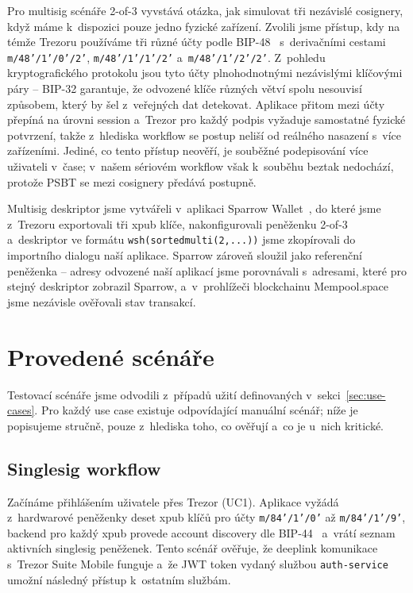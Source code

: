 Pro multisig scénáře 2-of-3 vyvstává otázka, jak simulovat tři nezávislé
cosignery, když máme k~dispozici pouze jedno fyzické zařízení. Zvolili jsme
přístup, kdy na témže Trezoru používáme tři různé účty podle BIP-48~\cite{BIP48}
s~derivačními cestami \texttt{m/48'/1'/0'/2'}, \texttt{m/48'/1'/1'/2'}
a~\texttt{m/48'/1'/2'/2'}. Z~pohledu kryptografického protokolu jsou tyto účty
plnohodnotnými nezávislými klíčovými páry -- BIP-32 garantuje, že odvozené
klíče různých větví spolu nesouvisí způsobem, který by šel z~veřejných dat
detekovat. Aplikace přitom mezi účty přepíná na úrovni session a~Trezor pro
každý podpis vyžaduje samostatné fyzické potvrzení, takže z~hlediska workflow
se postup neliší od reálného nasazení s~více zařízeními. Jediné, co tento
přístup neověří, je souběžné podepisování více uživateli v~čase; v~našem
sériovém workflow však k~souběhu beztak nedochází, protože PSBT se mezi
cosignery předává postupně.

Multisig deskriptor jsme vytvářeli v~aplikaci Sparrow Wallet~\cite{SparrowWallet},
do které jsme z~Trezoru exportovali tři xpub klíče, nakonfigurovali peněženku
2-of-3 a~deskriptor ve formátu \texttt{wsh(sortedmulti(2,...))} jsme zkopírovali
do importního dialogu naší aplikace. Sparrow zároveň sloužil jako referenční
peněženka -- adresy odvozené naší aplikací jsme porovnávali s~adresami, které
pro stejný deskriptor zobrazil Sparrow, a~v~prohlížeči blockchainu Mempool.space
jsme nezávisle ověřovali stav transakcí.

\section{Provedené scénáře}
\label{sec:test-scenare}

Testovací scénáře jsme odvodili z~případů užití definovaných
v~sekci~\ref{sec:use-cases}. Pro každý use case existuje odpovídající
manuální scénář; níže je popisujeme stručně, pouze z~hlediska toho, co
ověřují a~co je u~nich kritické.

\subsection{Singlesig workflow}
\label{subsec:scenare-singlesig}

Začínáme přihlášením uživatele přes Trezor
(UC1). Aplikace vyžádá z~hardwarové peněženky deset xpub klíčů pro účty
\texttt{m/84'/1'/0'} až \texttt{m/84'/1'/9'}, backend pro každý xpub provede
account discovery dle BIP-44~\cite{BIP44} a~vrátí seznam aktivních
singlesig peněženek. Tento scénář ověřuje, že deeplink komunikace s~Trezor
Suite Mobile funguje a~že JWT token vydaný službou \texttt{auth-service}
umožní následný přístup k~ostatním službám.

